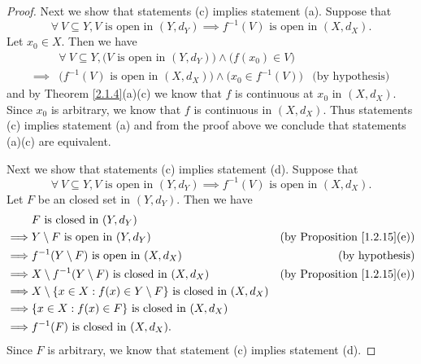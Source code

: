 \begin{proof}
    Next we show that statements (c) implies statement (a).
    Suppose that
    \[
        \forall\ V \subseteq Y, V \text{ is open in } (Y, d_Y) \implies f^{-1}(V) \text{ is open in } (X, d_X).
    \]
    Let \(x_0 \in X\).
    Then we have
    \begin{align*}
                 & \forall\ V \subseteq Y, \big(V \text{ is open in } (Y, d_Y)\big) \land \big(f(x_0) \in V\big)                          \\
        \implies & \big(f^{-1}(V) \text{ is open in } (X, d_X)\big) \land \big(x_0 \in f^{-1}(V)\big)            & \text{(by hypothesis)}
    \end{align*}
    and by Theorem \ref{2.1.4}(a)(c) we know that \(f\) is continuous at \(x_0\) in \((X, d_X)\).
    Since \(x_0\) is arbitrary, we know that \(f\) is continuous in \((X, d_X)\).
    Thus statements (c) implies statement (a) and from the proof above we conclude that statements (a)(c) are equivalent.

    Next we show that statements (c) implies statement (d).
    Suppose that
    \[
        \forall\ V \subseteq Y, V \text{ is open in } (Y, d_Y) \implies f^{-1}(V) \text{ is open in } (X, d_X).
    \]
    Let \(F\) be an closed set in \((Y, d_Y)\).
    Then we have
    \begin{align*}
                 & F \text{ is closed in } (Y, d_Y)                                                                                          \\
        \implies & Y \setminus F \text{ is open in } (Y, d_Y)                                      & \text{(by Proposition \ref{1.2.15}(e))} \\
        \implies & f^{-1}(Y \setminus F) \text{ is open in } (X, d_X)                              & \text{(by hypothesis)}                  \\
        \implies & X \setminus f^{-1}(Y \setminus F) \text{ is closed in } (X, d_X)                & \text{(by Proposition \ref{1.2.15}(e))} \\
        \implies & X \setminus \{x \in X : f(x) \in Y \setminus F\} \text{ is closed in } (X, d_X)                                           \\
        \implies & \{x \in X : f(x) \in F\} \text{ is closed in } (X, d_X)                                                                   \\
        \implies & f^{-1}(F) \text{ is closed in } (X, d_X).
    \end{align*}
    Since \(F\) is arbitrary, we know that statement (c) implies statement (d).


\end{proof}
